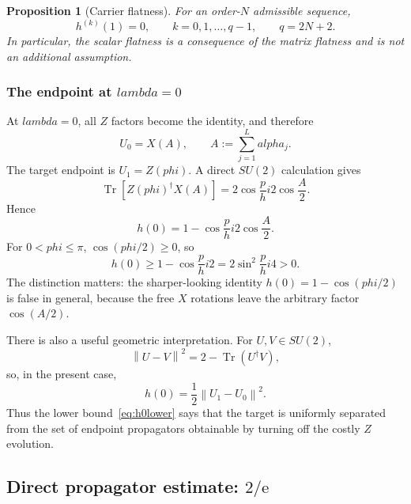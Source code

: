 \documentclass[%
  aps,
  pra,
  preprint,
  superscriptaddress,
  amsmath,amssymb,
  nofootinbib,
  floatfix,
]{revtex4-2}
\def\lambda{lambda}\def\tau{tau}\def\phi{phi}\def\alpha{alpha}%
\newtheorem{proposition}[theorem]{Proposition}
\theoremstyle{definition}
\theoremstyle{remark}
\newcommand{\Tr}{\operatorname{Tr}}
\newcommand{\norm}[1]{\left\lVert #1\right\rVert}
\begin{document}
\begin{proposition}[Carrier flatness]
\label{prop:flatness}
For an order-$N$ admissible sequence,
\begin{equation}
h^{(k)}(1)=0,
\qquad k=0,1,\ldots,q-1,
\qquad q=2N+2.
\label{eq:hflat}
\end{equation}
In particular, the scalar flatness is a consequence of the matrix flatness and is not an additional
assumption.
\end{proposition}

\subsubsection{The endpoint at \texorpdfstring{$\lambda=0$}{lambda=0}}

At $\lambda=0$, all $Z$ factors become the identity, and therefore
\begin{equation}
U_0=X(A),
\qquad A:=\sum_{j=1}^L\alpha_j.
\label{eq:u0}
\end{equation}
The target endpoint is $U_1=Z(\phi)$. A direct $SU(2)$ calculation gives
\begin{equation}
\Tr\![Z(\phi)^\dagger X(A)]
=2\cos\frac\phi2\cos\frac A2.
\end{equation}
Hence
\begin{equation}
\displaystyle
h(0)=1-\cos\frac\phi2\cos\frac A2.
\label{eq:h0exact}
\end{equation}
For $0<\phi\le\pi$, $\cos(\phi/2)\ge0$, so
\begin{equation}
h(0)\ge1-\cos\frac\phi2
=2\sin^2\frac\phi4>0.
\label{eq:h0lower}
\end{equation}
The distinction matters: the sharper-looking identity $h(0)=1-\cos(\phi/2)$ is false in
general, because the free $X$ rotations leave the arbitrary factor $\cos(A/2)$.

There is also a useful geometric interpretation. For $U,V\in SU(2)$,
\begin{equation}
\norm{U-V}^2=2-\Tr(U^\dagger V),
\end{equation}
so, in the present case,
\begin{equation}
h(0)=\frac12\norm{U_1-U_0}^2.
\label{eq:h-distance}
\end{equation}
Thus the lower bound~\eqref{eq:h0lower} says that the target is uniformly separated from the
set of endpoint propagators obtainable by turning off the costly $Z$ evolution.

\subsection{Direct propagator estimate: \texorpdfstring{$2/\mathrm{e}$}{2/e}}
\label{sec:direct}
\end{document}

